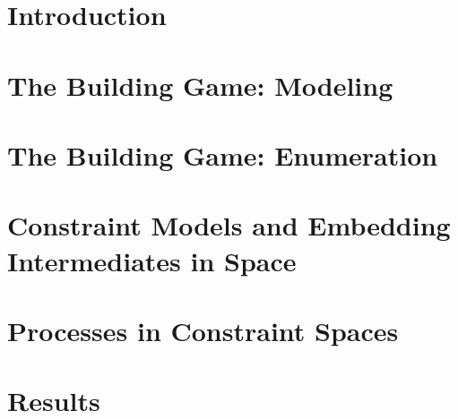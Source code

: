 \documentclass[12pt]{report}   %
\begin{document}
\chapter{Introduction}

\clearpage{\pagestyle{empty}\cleardoublepage}

\chapter{The Building Game: Modeling}

\clearpage{\pagestyle{empty}\cleardoublepage}

\chapter{The Building Game: Enumeration}

\clearpage{\pagestyle{empty}\cleardoublepage}

\chapter{Constraint Models and Embedding Intermediates in Space}

\clearpage{\pagestyle{empty}\cleardoublepage}

\chapter{Processes in Constraint Spaces}

\clearpage{\pagestyle{empty}\cleardoublepage}

\chapter{Results}

\clearpage{\pagestyle{empty}\cleardoublepage}

%
%
%



\begin{spacing}{0.9}
  
\end{spacing}
\end{document}
